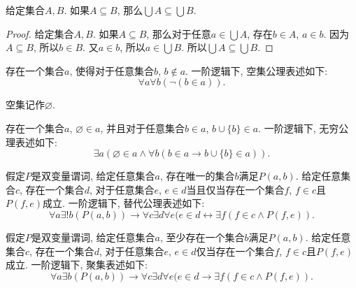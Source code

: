 \begin{proposition}
	给定集合$A,B$. 如果$A\subseteq B$, 那么$\bigcup A\subseteq \bigcup B$.
\end{proposition}

\begin{proof}
	给定集合$A,B$. 如果$A\subseteq B$, 那么对于任意$a\in \bigcup A$, 存在$b \in A$, $a\in b$. 因为$A\subseteq B$, 所以$b\in B$. 又$a\in b$, 所以$a\in \bigcup B$. 所以$\bigcup A\subseteq \bigcup B$.
\end{proof}

\begin{axiom}[空集公理]
	存在一个集合$a$, 使得对于任意集合$b$, $b\notin a$. 一阶逻辑下, 空集公理表述如下:
	\begin{equation}
		\forall a\forall b(\neg(b\in a)).
	\end{equation}

	空集记作$\varnothing$.
\end{axiom}

\begin{axiom}[无穷公理]
	存在一个集合$a$, $\varnothing \in a$, 并且对于任意集合$b\in a$, $b\cup \{b\}\in a$. 一阶逻辑下, 无穷公理表述如下:
	\begin{equation}
		\exists a(\varnothing \in a \wedge \forall b(b\in a \rightarrow b\cup\{b\}\in a)).
	\end{equation}
\end{axiom}

\begin{axiom}[替代公理]
	假定$P$是双变量谓词, 给定任意集合$a$, 存在唯一的集合$b$满足$P(a,b)$. 给定任意集合$c$, 存在一个集合$d$, 对于任意集合$e$, $e\in d$当且仅当存在一个集合$f$, $f\in c$且$P(f,e)$成立. 一阶逻辑下, 替代公理表述如下:
	\begin{equation}
		\forall a\exists !b(P(a,b))\rightarrow \forall c\exists d\forall e(e\in d\leftrightarrow \exists f(f\in c\wedge P(f, e)).
	\end{equation}
\end{axiom}

\begin{proposition}[聚集公理]
	假定$P$是双变量谓词, 给定任意集合$a$, 至少存在一个集合$b$满足$P(a,b)$. 给定任意集合$c$, 存在一个集合$d$, 对于任意集合$e$, $e\in d$仅当存在一个集合$f$, $f\in c$且$P(f,e)$成立. 一阶逻辑下, 聚集表述如下:
	\begin{equation}
		\forall a\exists b(P(a,b))\rightarrow \forall c\exists d\forall e(e\in d\rightarrow \exists f(f\in c\wedge P(f, e)).
	\end{equation}
\end{proposition}

